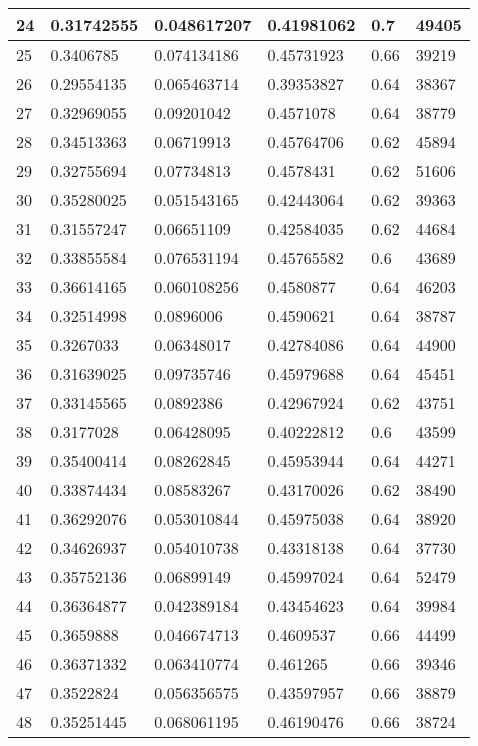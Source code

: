 \begin{longtable}{|l|l|l|l|l|l|}
24 & 0.31742555 & 0.048617207 & 0.41981062 & 0.7 & 49405 \\ \hline 
25 & 0.3406785 & 0.074134186 & 0.45731923 & 0.66 & 39219 \\ \hline 
26 & 0.29554135 & 0.065463714 & 0.39353827 & 0.64 & 38367 \\ \hline 
27 & 0.32969055 & 0.09201042 & 0.4571078 & 0.64 & 38779 \\ \hline 
28 & 0.34513363 & 0.06719913 & 0.45764706 & 0.62 & 45894 \\ \hline 
29 & 0.32755694 & 0.07734813 & 0.4578431 & 0.62 & 51606 \\ \hline 
30 & 0.35280025 & 0.051543165 & 0.42443064 & 0.62 & 39363 \\ \hline 
31 & 0.31557247 & 0.06651109 & 0.42584035 & 0.62 & 44684 \\ \hline 
32 & 0.33855584 & 0.076531194 & 0.45765582 & 0.6 & 43689 \\ \hline 
33 & 0.36614165 & 0.060108256 & 0.4580877 & 0.64 & 46203 \\ \hline 
34 & 0.32514998 & 0.0896006 & 0.4590621 & 0.64 & 38787 \\ \hline 
35 & 0.3267033 & 0.06348017 & 0.42784086 & 0.64 & 44900 \\ \hline 
36 & 0.31639025 & 0.09735746 & 0.45979688 & 0.64 & 45451 \\ \hline 
37 & 0.33145565 & 0.0892386 & 0.42967924 & 0.62 & 43751 \\ \hline 
38 & 0.3177028 & 0.06428095 & 0.40222812 & 0.6 & 43599 \\ \hline 
39 & 0.35400414 & 0.08262845 & 0.45953944 & 0.64 & 44271 \\ \hline 
40 & 0.33874434 & 0.08583267 & 0.43170026 & 0.62 & 38490 \\ \hline 
41 & 0.36292076 & 0.053010844 & 0.45975038 & 0.64 & 38920 \\ \hline 
42 & 0.34626937 & 0.054010738 & 0.43318138 & 0.64 & 37730 \\ \hline 
43 & 0.35752136 & 0.06899149 & 0.45997024 & 0.64 & 52479 \\ \hline 
44 & 0.36364877 & 0.042389184 & 0.43454623 & 0.64 & 39984 \\ \hline 
45 & 0.3659888 & 0.046674713 & 0.4609537 & 0.66 & 44499 \\ \hline 
46 & 0.36371332 & 0.063410774 & 0.461265 & 0.66 & 39346 \\ \hline 
47 & 0.3522824 & 0.056356575 & 0.43597957 & 0.66 & 38879 \\ \hline 
48 & 0.35251445 & 0.068061195 & 0.46190476 & 0.66 & 38724 \\ \hline 

\end{longtable}
